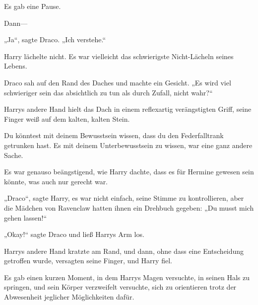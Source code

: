 Es gab eine Pause.

Dann—

„Ja“, sagte Draco. „Ich verstehe.“

Harry lächelte nicht. Es war vielleicht das schwierigste Nicht-Lächeln seines Lebens.

Draco sah auf den Rand des Daches und machte ein Gesicht. „Es wird viel schwieriger sein das absichtlich zu tun als durch Zufall, nicht wahr?“

\later

Harrys andere Hand hielt das Dach in einem reflexartig verängstigten Griff, seine Finger weiß auf dem kalten, kalten Stein.

Du könntest mit deinem Bewusstsein wissen, dass du den Federfalltrank getrunken hast. Es mit deinem Unterbewusstsein zu wissen, war eine ganz andere Sache.

Es war genauso beängstigend, wie Harry dachte, dass es für Hermine gewesen sein könnte, was auch nur gerecht war.

„Draco“, sagte Harry, es war nicht einfach, seine Stimme zu kontrollieren, aber die Mädchen von Ravenclaw hatten ihnen ein Drehbuch gegeben: „Du musst mich gehen lassen!“

„Okay!“ sagte Draco und ließ Harrys Arm los.

Harrys andere Hand kratzte am Rand, und dann, ohne dass eine Entscheidung getroffen wurde, versagten seine Finger, und Harry fiel.

Es gab einen kurzen Moment, in dem Harrys Magen versuchte, in seinen Hals zu springen, und sein Körper verzweifelt versuchte, sich zu orientieren trotz der Abwesenheit jeglicher Möglichkeiten dafür.

